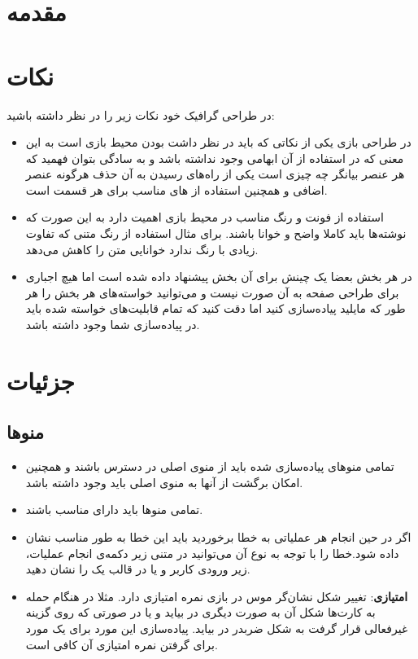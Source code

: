 \documentclass[]{article}
\begin{document}
\newpage

\section*{{\titr مقدمه}}

\section*{{\titr نکات}}
در طراحی گرافیک خود نکات زیر را در نظر داشته باشید:

\begin{itemize}
    \item در طراحی بازی یکی از نکاتی که باید در نظر داشت  بودن محیط بازی است به این معنی که در استفاده از آن ابهامی وجود نداشته باشد و به سادگی بتوان فهمید که هر عنصر بیانگر چه چیزی است یکی از را‌ه‌های رسیدن به آن حذف هرگونه عنصر اضافی و همچنین استفاده از  های مناسب برای هر قسمت است.
    \item استفاده از فونت و رنگ مناسب در محیط بازی اهمیت دارد به این صورت که نوشته‌ها باید کاملا واضح و خوانا باشند. برای مثال استفاده از رنگ متنی که تفاوت زیادی با رنگ  ندارد خوانایی متن را کاهش می‌دهد.
    \item در هر بخش بعضا یک چینش برای آن بخش پیشنهاد داده شده است اما هیچ اجباری برای طراحی صفحه به آن صورت نیست و می‌توانید خواسته‌های هر بخش را هر طور که مایلید پیاده‌سازی کنید اما دقت کنید که تمام قابلیت‌های خواسته شده باید در پیا‌ده‌سازی شما وجود داشته باشد.
\end{itemize}

\section*{{\titr جزئیات}}

\subsection*{{\titr منوها}}

\begin{itemize}
    \item تمامی منو‌های پیاده‌سازی شده باید از منوی‌ اصلی در دسترس باشند و همچنین امکان برگشت از آنها به منوی اصلی باید وجود داشته باشد.
    \item تمامی‌ منو‌ها باید دارای  مناسب باشند.
    \item اگر در حین انجام هر عملیاتی به خطا برخوردید باید این خطا به طور مناسب نشان داده شود.خطا را با توجه به نوع آن می‌توانید در متنی زیر دکمه‌ی انجام عملیات،  زیر  ورودی کاربر و یا در قالب  یک  را نشان دهید.
    \item \textbf{امتیازی}: تغییر شکل نشان‌گر موس در بازی نمره امتیازی دارد. مثلا در هنگام حمله به کارت‌ها شکل آن به صورت دیگری در بیاید و یا در صورتی که روی گزینه غیرفعالی قرار گرفت به شکل ضربدر در بیاید. پیاده‌سازی این مورد برای یک مورد برای گرفتن نمره امتیازی آن کافی است. 
\end{itemize}
\end{document}
